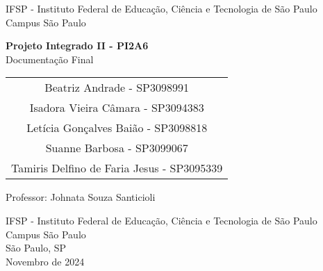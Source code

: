 \documentclass[
    12pt,               %
    openright,          %
    oneside,
    a4paper,            %
    hyphens,
    paginasA3,  %
    GLOSSARIO, %
    TODO, %
    english,            %
    brazil           %
    ]{regras-pi1a5} %
\begin{document}
\frenchspacing 

\newpage

\pretextual


\newcommand{\todonum}[2][]
{\stepcounter{todocounter}\todo[#1]{\thetodocounter: #2}}






\begin{titlepage}
    \begin{center}
        \vspace*{1cm}
        
        {\Large{IFSP - Instituto Federal de Educação, Ciência e Tecnologia de São Paulo}} \\
        \vspace{0.2cm}
        {\large{Campus São Paulo}}
        
        \vspace{6cm}
    
        
        \textbf{\LARGE{Projeto Integrado II - PI2A6}}\\
        \vspace{0.2cm}
        {\large{Documentação Final}}
        
        \vspace{1.5cm}
        
        \begin{tabular}{c}
            {\large Beatriz Andrade - SP3098991} \\
            {\large Isadora Vieira Câmara - SP3094383} \\
            {\large Letícia Gonçalves Baião - SP3098818} \\
            {\large Suanne Barbosa - SP3099067} \\
            {\large Tamiris Delfino de Faria Jesus - SP3095339} \\
        \end{tabular}
        
        \vspace{1.5cm}
        
        {\large Professor: Johnata Souza Santicioli} \\


        \vfill
        
        \large{IFSP - Instituto Federal de Educação, Ciência e Tecnologia de São Paulo \\
        Campus São Paulo \\
        São Paulo, SP \\
        Novembro de 2024}
        
    \end{center}
\end{titlepage}
\end{document}
